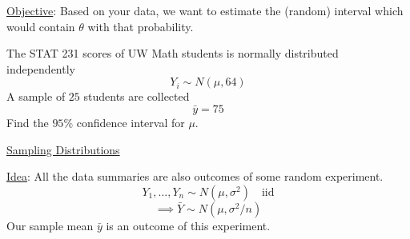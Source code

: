 \underline{Objective}: Based on your data, we want to estimate the (random)
interval which would contain $ \theta $ with that probability.
\begin{exbox}
    \begin{example}
        The STAT 231 scores of UW Math students is normally distributed independently
        \[ Y_i \sim N(\mu,64) \]
        A sample of $ 25 $ students are collected
        \[ \bar{y}=75 \]
        Find the $ 95\% $ confidence interval for $ \mu $.
    \end{example}
\end{exbox}
\underline{Sampling Distributions}

\underline{Idea}: All the data summaries are also outcomes of some random experiment.
\[ Y_1,\ldots ,Y_n \sim N(\mu,\sigma^2) \quad\text{iid}\]
\[ \implies \bar{Y} \sim N(\mu,\sigma^2/n) \]
Our sample mean $ \bar{y} $ is an outcome of this experiment.
